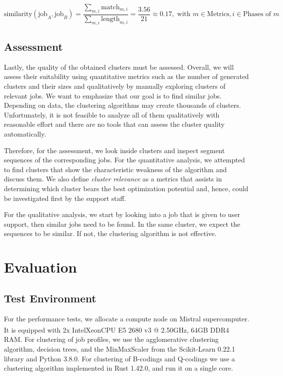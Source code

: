 \documentclass{jhps}
\begin{document}
\begin{equation}\label{lst:pm_quant:phase_matching_example:similarity}
	\text{similarity}(\text{job}_A, \text{job}_B) = \frac{\sum_{m,i}{\text{match}_{m,i}}}{\sum_{m,i}{\text{length}_{m,i}}} = \frac{3.56}{21} \approx 0.17, \text{ with } m \in \text{Metrics}, i \in \text{Phases of } m
\end{equation}


\subsection{Assessment}
Lastly, the quality of the obtained clusters must be assessed.
Overall, we will assess their suitability using quantitative metrics such as the number of generated clusters and their sizes and qualitatively by manually exploring clusters of relevant jobs.
We want to emphasize that our goal is to find similar jobs.
Depending on data, the clustering algorithms may create thousands of clusters.
Unfortunately, it is not feasible to analyze all of them qualitatively with reasonable effort and there are no tools that can assess the cluster quality automatically.

Therefore, for the assessment, we look inside clusters and inspect segment sequences of the corresponding jobs.
For the quantitative analysis, we attempted to find clusters that show the characteristic weakness of the algorithm and discuss them.
We also define \textit{cluster relevance} as a metrics that assists in determining which cluster bears the best optimization potential and, hence, could be investigated first by the support staff.

For the qualitative analysis, we start by looking into a job that is given to user support, then similar jobs need to be found.
In the same cluster, we expect the sequences to be similar.
If not, the clustering algorithm is not effective.



\section{Evaluation}%
\label{sec:evaluation}

\subsection{Test Environment}%
\label{sec:test_environment}
For the performance tests, we allocate a compute node on Mistral supercomputer.
It is equipped with 2x Intel\textsuperscript\textregistered\@ Xeon\textsuperscript\textregistered\@ CPU E5 2680 v3 @ 2.50GHz, 64GB DDR4 RAM\@.
For clustering of job profiles, we use the agglomerative clustering algorithm, decision trees, and the MinMaxScaler from the Scikit-Learn 0.22.1 library and Python 3.8.0.
For clustering of B-codings and Q-codings we use a clustering algorithm implemented in Rust 1.42.0, and run it on a single core.
\end{document}
